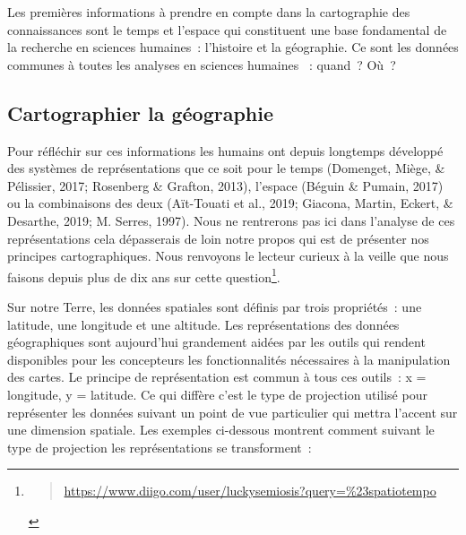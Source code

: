 \documentclass[
  a4paper,
  DIV=11,
  numbers=noendperiod]{scrreprt}
\begin{document}
Les premières informations à prendre en compte dans la cartographie des
connaissances sont le temps et l'espace qui constituent une base
fondamental de la recherche en sciences humaines~: l'histoire et la
géographie. Ce sont les données communes à toutes les analyses en
sciences humaines ~: quand~? Où~?

\subsection{Cartographier la géographie}\label{sec-cartoGeo}

Pour réfléchir sur ces informations les humains ont depuis longtemps
développé des systèmes de représentations que ce soit pour le temps
(Domenget, Miège, \& Pélissier, 2017; Rosenberg \& Grafton, 2013),
l'espace (Béguin \& Pumain, 2017) ou la combinaisons des deux
(Aït-Touati et al., 2019; Giacona, Martin, Eckert, \& Desarthe, 2019; M.
Serres, 1997). Nous ne rentrerons pas ici dans l'analyse de ces
représentations cela dépasserais de loin notre propos qui est de
présenter nos principes cartographiques. Nous renvoyons le lecteur
curieux à la veille que nous faisons depuis plus de dix ans sur cette
question\footnote{\begin{quote}
  \url{https://www.diigo.com/user/luckysemiosis?query=\%23spatiotempo}
  \end{quote}}.

Sur notre Terre, les données spatiales sont définis par trois
propriétés~: une latitude, une longitude et une altitude. Les
représentations des données géographiques sont aujourd'hui grandement
aidées par les outils qui rendent disponibles pour les concepteurs les
fonctionnalités nécessaires à la manipulation des cartes. Le principe de
représentation est commun à tous ces outils~: x = longitude, y =
latitude. Ce qui diffère c'est le type de projection utilisé pour
représenter les données suivant un point de vue particulier qui mettra
l'accent sur une dimension spatiale. Les exemples ci-dessous montrent
comment suivant le type de projection les représentations se
transforment~:
\end{document}
